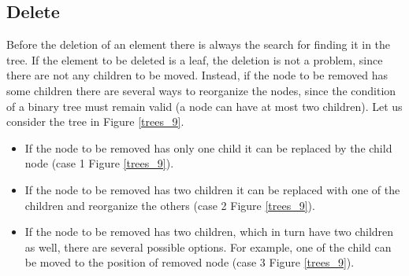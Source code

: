 \subsection{Delete}
Before the deletion of an element there is always the search for finding it in the tree. If the element to be deleted is a leaf, the deletion is not a problem, since there are not any children to be moved. Instead, if the node to be removed has some children there are several ways to reorganize the nodes, since the condition of a binary tree must remain valid (a node can have at most two children). Let us consider the tree in Figure \ref{trees_9}.
\begin{itemize}
\item If the node to be removed has only one child it can be replaced by the child node (case 1 Figure \ref{trees_9}).
\item If the node to be removed has two children it can be replaced with one of the children and reorganize the others (case 2 Figure \ref{trees_9}).
\item If the node to be removed has two children, which in turn  have two children as well, there are several possible options. For example, one of the child can be moved to the position of removed node (case 3 Figure \ref{trees_9}).
\end{itemize} 

